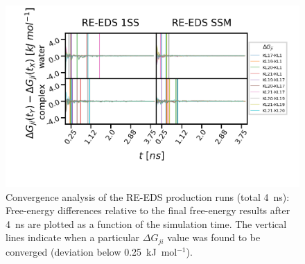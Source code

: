\begin{figure}[h]
\centering
\includegraphics[width=\linewidth]{fig/results/ringOpening/FE/dF_RingOpening_Convergence.png}
\caption{Convergence analysis of the RE-EDS production runs (total 4~ns): Free-energy differences relative to the final free-energy results after 4~ns are plotted as a function of the simulation time. The vertical lines indicate when a particular $\Delta G_{ji}$ value was found to be converged (deviation below 0.25~kJ~mol$^{-1}$).}
\label{SIfig:CHK1_RingOpening_dF_convergence}
\end{figure}

%

 